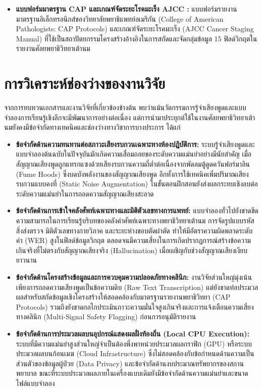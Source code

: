 \begin{itemize}
    \item \textbf{แบบฟอร์มมาตรฐาน CAP \cite{cap_breast} และเกณฑ์จัดระยะโรคมะเร็ง AJCC \cite{ajcc2017}:} แบบฟอร์มรายงานมาตรฐานอิเล็กทรอนิกส์ของวิทยาลัยพยาธิแพทย์อเมริกัน (College of American Pathologists: CAP Protocols) และเกณฑ์จัดระยะโรคมะเร็ง (AJCC Cancer Staging Manual) ที่ใช้เป็นสถาปัตยกรรมโครงสร้างอ้างอิงในการสกัดและจัดกลุ่มข้อมูล 15 ฟิลด์วิกฤตในรายงานศัลยพยาธิวิทยาเต้านม
\end{itemize}

\section{การวิเคราะห์ช่องว่างของงานวิจัย}

จากการทบทวนเอกสารและงานวิจัยที่เกี่ยวข้องข้างต้น พบว่าแม้นวัตกรรมการรู้จำเสียงพูดและแบบจำลองการเรียนรู้เชิงลึกจะมีพัฒนาการอย่างต่อเนื่อง แต่การนำมาประยุกต์ใช้ในงานศัลยพยาธิวิทยาเต้านมยังคงมีข้อจำกัดทางเทคนิคและช่องว่างทางวิชาการบางประการ ได้แก่

\begin{itemize}
    \item \textbf{ข้อจำกัดด้านความทนทานต่อสภาวะเสียงรบกวนเฉพาะทางห้องปฏิบัติการ:} ระบบรู้จำเสียงพูดและแบบจำลองต้นฉบับในปัจจุบันมักเกิดความเสื่อมถอยของระดับความแม่นยำอย่างมีนัยสำคัญ เมื่อสัญญาณเสียงพูดถูกแทรกแซงด้วยเสียงรบกวนความถี่ต่ำต่อเนื่องจากพัดลมตู้ดูดควันฟอร์มาลิน (Fume Hoods) ซึ่งบดบังพลังงานของสัญญาณเสียงพูด อีกทั้งการใช้เทคนิคเพิ่มปริมาณเสียงรบกวนแบบคงที่ (Static Noise Augmentation) ในขั้นตอนฝึกสอนยังส่งผลกระทบเชิงลบต่อระดับความแม่นยำในการถอดความสัญญาณเสียงสะอาด
    \item \textbf{ข้อจำกัดด้านการเข้าใจคลังศัพท์เฉพาะทางและมิติตัวเลขทางการแพทย์:} แบบจำลองทั่วไปยังขาดขีดความสามารถในการเรียนรู้บริบทของคลังคำศัพท์เฉพาะทางพยาธิวิทยาเต้านม การจัดรูปแบบรหัสสิ่งส่งตรวจ มิติตัวเลขทางกายวิภาค และระยะห่างขอบตัดผ่าตัด ทำให้มีอัตราความผิดพลาดระดับคำ (WER) สูงในฟิลด์ข้อมูลวิกฤต ตลอดจนมีความเสี่ยงในการเกิดปรากฏการณ์สร้างข้อความเกินจริงที่ไม่ตรงกับสัญญาณเสียงจริง (Hallucination) เมื่อเผชิญกับช่วงสัญญาณเสียงเงียบยาวนาน
    \item \textbf{ข้อจำกัดด้านโครงสร้างข้อมูลและการควบคุมความปลอดภัยทางคลินิก:} งานวิจัยส่วนใหญ่มุ่งเน้นเพียงการถอดความเสียงพูดเป็นข้อความดิบ (Raw Text Transcription) แต่ยังขาดท่อประมวลผลสำหรับสกัดข้อมูลเชิงโครงสร้างให้สอดคล้องกับมาตรฐานรายงานพยาธิวิทยา (CAP Protocols) รวมถึงยังขาดกลไกประเมินภาวะความมั่นใจสูงเกินจริงและการแจ้งเตือนความเสี่ยงทางคลินิก (Multi-Signal Safety Flagging) ก่อนการอนุมัติรายงาน
    \item \textbf{ข้อจำกัดด้านการประมวลผลบนอุปกรณ์แสดงผลฝั่งท้องถิ่น (Local CPU Execution):} ระบบที่มีความแม่นยำสูงส่วนใหญ่จำเป็นต้องพึ่งพาหน่วยประมวลผลกราฟิก (GPU) หรือระบบประมวลผลบนก้อนเมฆ (Cloud Infrastructure) ซึ่งไม่สอดคล้องกับข้อกำหนดด้านความเป็นส่วนตัวของข้อมูลผู้ป่วย (Data Privacy) และข้อจำกัดด้านงบประมาณทรัพยากรของสถานพยาบาล ขณะที่ระบบประมวลผลภายในเครื่องแบบเดิมยังมีข้อจำกัดด้านความแม่นยำและขนาดไฟล์แบบจำลอง
\end{itemize}

